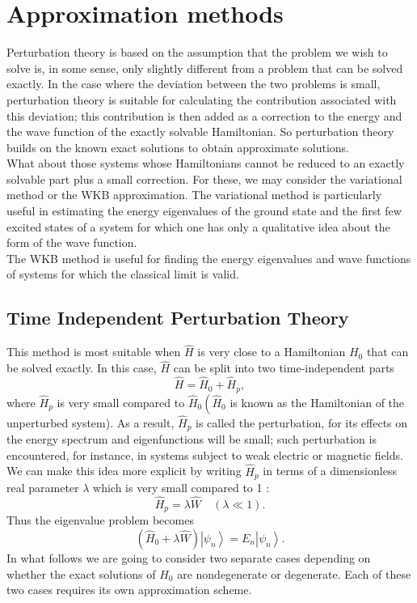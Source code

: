 \chapter{Approximation methods}
Perturbation theory is based on the assumption that the problem we wish to solve is, in some sense, only slightly different from a problem that can be solved exactly. In the case where the deviation between the two problems is small, perturbation theory is suitable for calculating the contribution associated with this deviation; this contribution is then added as a correction to the energy and the wave function of the exactly solvable Hamiltonian. So perturbation theory builds on the known exact solutions to obtain approximate solutions.\\
What about those systems whose Hamiltonians cannot be reduced to an exactly solvable part plus a small correction. For these, we may consider the variational method or the WKB approximation. The variational method is particularly useful in estimating the energy eigenvalues of the ground state and the first few excited states of a system for which one has only a qualitative idea about the form of the wave function.\\
The WKB method is useful for finding the energy eigenvalues and wave functions of systems for which the classical limit is valid. 
\section{Time Independent Perturbation Theory}
This method is most suitable when $\hat{H}$ is very close to a Hamiltonian $H_{0}$ that can be solved exactly. In this case, $\hat{H}$ can be split into two time-independent parts
$$
\hat{H}=\hat{H}_{0}+\hat{H}_{p},
$$
where $\hat{H}_{p}$ is very small compared to $\hat{H}_{0}\left(\hat{H}_{0}\right.$ is known as the Hamiltonian of the unperturbed system). As a result, $\hat{H}_{p}$ is called the perturbation, for its effects on the energy spectrum and eigenfunctions will be small; such perturbation is encountered, for instance, in systems subject to weak electric or magnetic fields. We can make this idea more explicit by writing $\hat{H}_{p}$ in terms of a dimensionless real parameter $\lambda$ which is very small compared to 1 :
$$
\hat{H}_{p}=\lambda \hat{W} \quad(\lambda \ll 1) .
$$
Thus the eigenvalue problem becomes
$$
\left(\hat{H}_{0}+\lambda \hat{W}\right)\left|\psi_{n}\right\rangle=E_{n}\left|\psi_{n}\right\rangle .
$$
In what follows we are going to consider two separate cases depending on whether the exact solutions of $\hat{H}_{0}$ are nondegenerate or degenerate. Each of these two cases requires its own approximation scheme.
